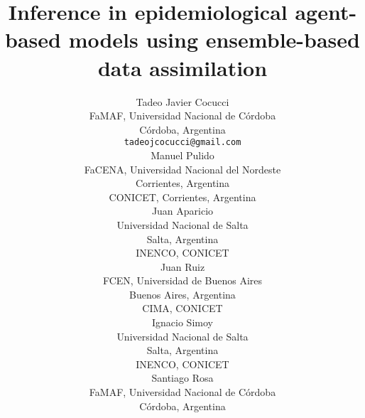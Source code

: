 \documentclass[11pt,a4paper]{article}
\begin{document}
\title{Inference in  epidemiological agent-based models using ensemble-based data assimilation}

\author{
    Tadeo Javier Cocucci \\
    FaMAF, Universidad Nacional de Córdoba \\
    Córdoba, Argentina \\
    \texttt{tadeojcocucci@gmail.com} \\
    \And
    Manuel Pulido \\
    FaCENA, Universidad Nacional del Nordeste\\
    Corrientes, Argentina\\
    CONICET, Corrientes, Argentina\\
    \And
    Juan Aparicio \\
    Universidad Nacional de Salta \\
    Salta, Argentina \\
    INENCO, CONICET \\
    \And
    Juan Ruiz \\
    FCEN, Universidad de Buenos Aires \\
    Buenos Aires, Argentina \\
    CIMA, CONICET \\
    \And
    Ignacio Simoy \\
    Universidad Nacional de Salta \\
    Salta, Argentina \\
    INENCO, CONICET \\
    \And
    Santiago Rosa \\
    FaMAF, Universidad Nacional de Córdoba \\
    Córdoba, Argentina \\
}

\maketitle
\end{document}
